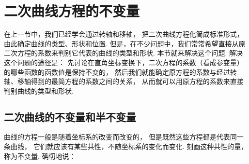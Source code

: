 \section{二次曲线方程的不变量}
在上一节中，我们已经学会通过转轴和移轴，
把二次曲线方程化简成标准形式，由此确定曲线的类型、形状和位置.
但是，在不少问题中，我们常常希望直接从原二次方程的系数来判别它代表的曲线的类型和形状.
本节就来解决这个问题.
解决这个问题的途径是：
先讨论在直角坐标变换下，二次方程的系数（看成参变量）的哪些函数的函数值是保持不变的，
然后我们就能确定原方程的系数与经过转轴、移轴得到的最简方程的系数之间的关系，
从而就可以用原方程的系数来直接判别曲线的类型和形状.

\subsection{二次曲线的不变量和半不变量}
曲线的方程一般是随着坐标系的改变而改变的，
但是既然这些方程都是代表同一条曲线，
它们就应该有某些共性，不随坐标系的变化而变化.
刻画这种共性的量，称为不变量.
确切地说：
